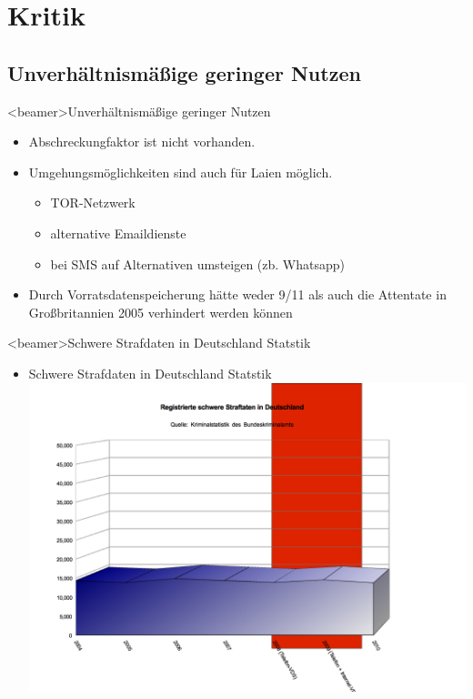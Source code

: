 \section{Kritik}
  \subsection*{Unverhältnismäßige geringer Nutzen}
    \begin{frame}<beamer>{Unverhältnismäßige geringer Nutzen}
      \begin{itemize}
        \item
          Abschreckungfaktor ist nicht vorhanden.
        \item
         Umgehungsmöglichkeiten sind auch für Laien möglich.
        \begin{itemize}
          \item TOR-Netzwerk
          \item alternative Emaildienste
          \item bei SMS auf Alternativen umsteigen (zb. Whatsapp)
        \end{itemize}
        \item Durch Vorratsdatenspeicherung hätte weder 9/11 als auch die Attentate in Großbritannien 2005 verhindert werden können
      \end{itemize}
    \end{frame}

\begin{frame}<beamer>{Schwere Strafdaten in Deutschland Statstik}
\begin{itemize}
        \item Schwere Strafdaten in Deutschland Statstik
        \includegraphics[height=1\textheight]{sections/img/schwere_verbrechen_in_DE.png}
    \end{itemize}
    \end{frame}
    
